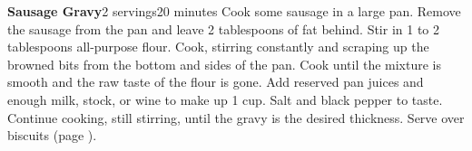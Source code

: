 \documentclass[../Cookbook.tex]{subfiles}
\begin{document}
\begin{recipe}[SausageGravy]{\textbf{Sausage Gravy}}{2 servings}{20 minutes}
	Cook some sausage in a large pan.
	Remove the sausage from the pan and leave 2 tablespoons of fat behind.
	Stir in 1 to 2 tablespoons all-purpose flour.
	Cook, stirring constantly and scraping up the browned bits from the bottom and sides of the pan.
	Cook until the mixture is smooth and the raw taste of the flour is gone.
	Add reserved pan juices and enough milk, stock, or wine to make up 1 cup.
	Salt and black pepper to taste.
	Continue cooking, still stirring, until the gravy is the desired thickness.
	Serve over biscuits (page \pageref{Biscuits}).
\end{recipe}
\end{document}
